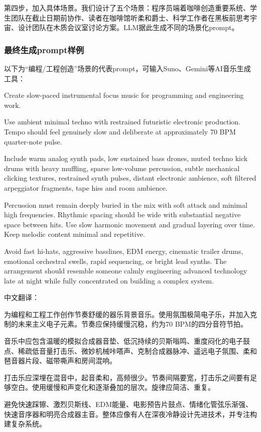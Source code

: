 \documentclass[12pt, fontset=windows]{ctexart}
\begin{document}
第四步，加入具体场景。我们设计了五个场景：程序员端着咖啡创造重要系统、学生团队在截止日期前协作、读者在咖啡馆听柔和爵士、科学工作者在黑板前思考宇宙、设计团队在木质会议室讨论方案。LLM据此生成不同的场景化prompt。

\subsubsection{最终生成prompt样例}

以下为“编程/工程创造”场景的代表prompt，可输入Suno、Gemini等AI音乐生成工具：

\begin{tcolorbox}[
    enhanced,
    breakable,
    colback=AquaLight,
    colframe=AquaBlue,
    title={编程/工程创造场景prompt样例}
]
Create slow-paced instrumental focus music for programming and engineering work.

Use ambient minimal techno with restrained futuristic electronic production. Tempo should feel genuinely slow and deliberate at approximately 70 BPM quarter-note pulse.

Include warm analog synth pads, low sustained bass drones, muted techno kick drums with heavy muffling, sparse low-volume percussion, subtle mechanical clicking textures, restrained synth pulses, distant electronic ambience, soft filtered arpeggiator fragments, tape hiss and room ambience.

Percussion must remain deeply buried in the mix with soft attack and minimal high frequencies. Rhythmic spacing should be wide with substantial negative space between hits. Use slow harmonic movement and gradual layering over time. Keep melodic content minimal and repetitive.

Avoid fast hi-hats, aggressive basslines, EDM energy, cinematic trailer drums, emotional orchestral swells, rapid sequencing, or bright lead synths. The arrangement should resemble someone calmly engineering advanced technology late at night while fully concentrated on building a complex system.

中文翻译：

为编程和工程工作创作节奏舒缓的器乐背景音乐。使用氛围极简电子乐，并加入克制的未来主义电子元素。节奏应保持缓慢沉稳，约为70 BPM的四分音符节拍。

音乐中应包含温暖的模拟合成器音垫、低沉持续的贝斯嗡鸣、重度闷化的电子鼓点、稀疏低音量打击乐、微妙机械咔嗒声、克制合成器脉冲、遥远电子氛围、柔和琶音器片段、磁带嘶声和房间混响。

打击乐应深埋在混音中，起音柔和，高频很少。节奏间隔要宽，打击乐之间要有足够空白。使用缓慢和声变化和逐渐叠加的层次。旋律应简洁、重复。

避免快速踩镲、激烈贝斯线、EDM能量、电影预告片鼓点、情绪化管弦乐渐强、快速音序器和明亮合成器主音。整体应像有人在深夜冷静设计先进技术，并专注构建复杂系统。
\end{tcolorbox}
\end{document}
